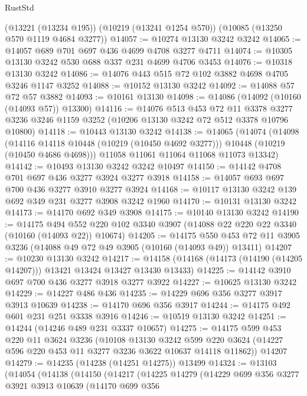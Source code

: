 \begin{lexlean}{RustStd}
\begin{coremodule}
    (@13221 (@13234 @195))
    (@10219 (@13241 @1254 @570))
    (@10085 (@13250 @570 @1119 @4684 @3277))
@14057 := @10274 @13130 @3242 @3242
@14065 := @14057 @689 @701 @697 @436 @4699 @4708 @3277 @4711
@14074 := @10305 @13130 @3242 @530 @688 @337 @231 @4699 @4706 @3453
@14076 := @10318 @13130 @3242
@14086 := @14076 @443 @515 @72 @102 @3882 @4698 @4705 @3246 @1147 @3252
@14088 := @10152 @13130 @3242
@14092 := @14088 @57 @72 @57 @3882
@14093 := @10161 @13130
@14098 := @14086 (@14092 (@10160 (@14093 @57)) @13300)
@14116 := @14076
    @513
    @453
    @72
    @11
    @3378
    @3277
    @3236
    @3246
    @1159
    @3252
    (@10206 @13130 @3242 @72 @512 @3378 @10796 @10800)
@14118 := @10443 @13130 @3242
@14138 := @14065
    (@14074
      (@14098
        (@14116 @14118 @10448 (@10219 (@10450 @4692 @3277)))
        @10448
        (@10219 (@10450 @4686 @4698)))
      @11058
      @11061
      @11064
      @11068
      @11073
      @13342)
@14142 := @10493 @13130 @3242 @3242 @10497
@14150 := @14142 @4708 @701 @697 @436 @3277 @3924 @3277 @3918
@14158 := @14057 @693 @697 @700 @436 @3277 @3910 @3277 @3924
@14168 := @10117 @13130 @3242 @139 @692 @349 @231 @3277 @3908 @3242 @1960
@14170 := @10131 @13130 @3242
@14173 := @14170 @692 @349 @3908
@14175 := @10140 @13130 @3242
@14190 := @14175
    @494
    @552
    @220
    @102
    @3340
    @3907
    (@14088 @22 @220 @22 @3340 (@10160 (@14093 @22)) @10674)
@14205 := @14175
    @550
    @453
    @72
    @11
    @3905
    @3236
    (@14088 @49 @72 @49 @3905 (@10160 (@14093 @49)) @13411)
@14207 := @10230 @13130 @3242
@14217 := @14158 (@14168 (@14173 (@14190 (@14205 @14207))) @13421 @13424 @13427 @13430 @13433)
@14225 := @14142 @3910 @697 @700 @436 @3277 @3918 @3277 @3922
@14227 := @10625 @13130 @3242
@14229 := @14227 @486 @436
@14235 := @14229 @696 @356 @3277 @3917 @3913 @10639
@14238 := @14170 @696 @356 @3917
@14244 := @14175 @492 @601 @231 @251 @3338 @3916
@14246 := @10519 @13130 @3242
@14251 := @14244 (@14246 @489 @231 @3337 @10657)
@14275 := @14175
    @599
    @453
    @220
    @11
    @3624
    @3236
    (@10108
      @13130
      @3242
      @599
      @220
      @3624
      (@14227 @596 @220 @453 @11 @3277 @3236 @3622 @10637 @14118 @11862))
    @14207
@14279 := @14235 (@14238 (@14251 @14275)) @13499
@14324 := @13103
    (@14054
      (@14138
        (@14150
          (@14217
            (@14225
              @14279
              (@14229
                @699
                @356
                @3277
                @3921
                @3913
                @10639
                (@14170
                  @699
                  @356

\end{coremodule}
\end{lexlean}
